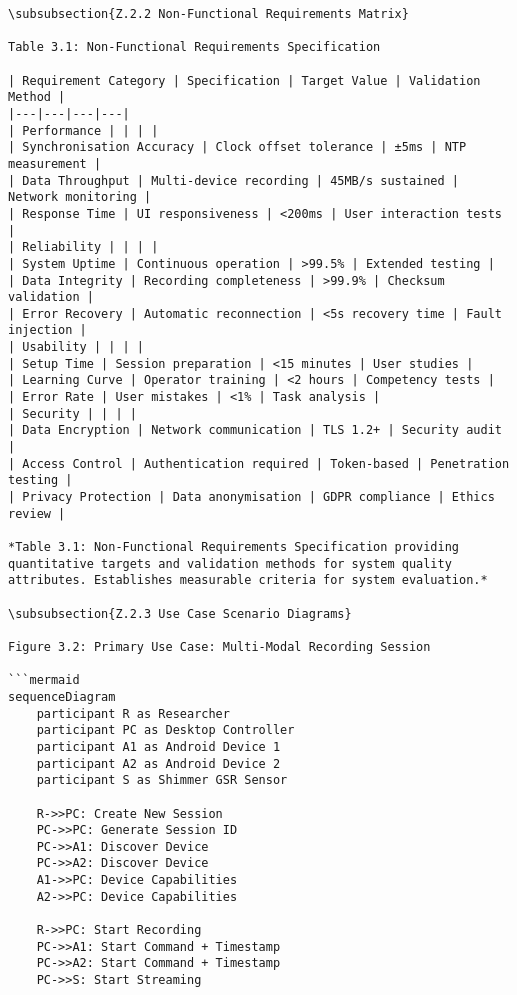 \begin{verbatim}
\subsubsection{Z.2.2 Non-Functional Requirements Matrix}

Table 3.1: Non-Functional Requirements Specification

| Requirement Category | Specification | Target Value | Validation Method |
|---|---|---|---|
| Performance | | | |
| Synchronisation Accuracy | Clock offset tolerance | ±5ms | NTP measurement |
| Data Throughput | Multi-device recording | 45MB/s sustained | Network monitoring |
| Response Time | UI responsiveness | <200ms | User interaction tests |
| Reliability | | | |
| System Uptime | Continuous operation | >99.5% | Extended testing |
| Data Integrity | Recording completeness | >99.9% | Checksum validation |
| Error Recovery | Automatic reconnection | <5s recovery time | Fault injection |
| Usability | | | |
| Setup Time | Session preparation | <15 minutes | User studies |
| Learning Curve | Operator training | <2 hours | Competency tests |
| Error Rate | User mistakes | <1% | Task analysis |
| Security | | | |
| Data Encryption | Network communication | TLS 1.2+ | Security audit |
| Access Control | Authentication required | Token-based | Penetration testing |
| Privacy Protection | Data anonymisation | GDPR compliance | Ethics review |

*Table 3.1: Non-Functional Requirements Specification providing
quantitative targets and validation methods for system quality
attributes. Establishes measurable criteria for system evaluation.*

\subsubsection{Z.2.3 Use Case Scenario Diagrams}

Figure 3.2: Primary Use Case: Multi-Modal Recording Session

```mermaid
sequenceDiagram
    participant R as Researcher
    participant PC as Desktop Controller
    participant A1 as Android Device 1
    participant A2 as Android Device 2
    participant S as Shimmer GSR Sensor

    R->>PC: Create New Session
    PC->>PC: Generate Session ID
    PC->>A1: Discover Device
    PC->>A2: Discover Device
    A1->>PC: Device Capabilities
    A2->>PC: Device Capabilities

    R->>PC: Start Recording
    PC->>A1: Start Command + Timestamp
    PC->>A2: Start Command + Timestamp
    PC->>S: Start Streaming


\end{verbatim}
